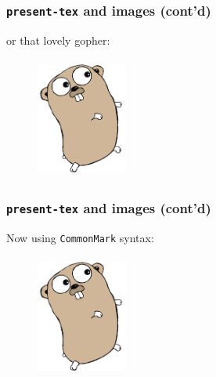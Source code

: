 \documentclass[9pt]{beamer}
\begin{document}
\begin{frame}[fragile]
\frametitle{\texttt{present-tex} and images (cont'd)}

or that lovely gopher:



\begin{figure}[h]
\begin{center}
\includegraphics[width=3cm,height=4cm]{_figs/gopher.png}
\end{center}
\end{figure}

\end{frame}

\begin{frame}[fragile]
\frametitle{\texttt{present-tex} and images (cont'd)}

Now using \texttt{CommonMark} syntax:

\begin{figure}[h]
\begin{center}
\includegraphics[width=3cm,height=4cm]{_figs/gopher.png}
\end{center}
\end{figure}




\end{frame}
\end{document}
